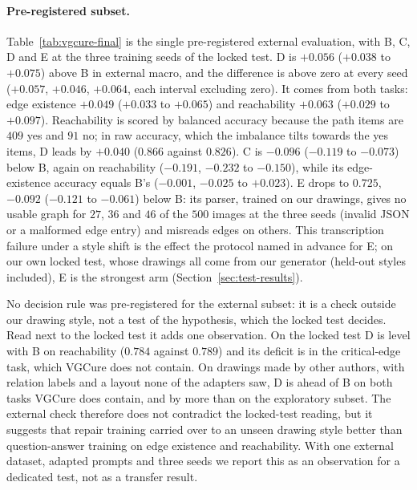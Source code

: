 \paragraph{Pre-registered subset.}
Table~\ref{tab:vgcure-final} is the single pre-registered external evaluation, with B, C, D
and E at the three training seeds of the locked test. D is $+0.056$ ($+0.038$ to $+0.075$)
above B in external macro, and the difference is above zero at every seed ($+0.057$, $+0.046$,
$+0.064$, each interval excluding zero). It comes from both tasks: edge existence $+0.049$
($+0.033$ to $+0.065$) and reachability $+0.063$ ($+0.029$ to $+0.097$). Reachability is scored by
balanced accuracy because the path items are $409$ yes and $91$ no; in raw accuracy, which the
imbalance tilts towards the yes items, D leads by $+0.040$ ($0.866$ against $0.826$). C is $-0.096$
($-0.119$ to $-0.073$) below B, again on reachability ($-0.191$, $-0.232$ to $-0.150$), while
its edge-existence accuracy equals B's ($-0.001$, $-0.025$ to $+0.023$). E drops to $0.725$,
$-0.092$ ($-0.121$ to $-0.061$) below B: its parser, trained on our drawings, gives no usable
graph for $27$, $36$ and $46$ of the $500$ images at the three seeds (invalid JSON or a
malformed edge entry) and misreads edges on others. This transcription failure under a style
shift is the effect the protocol named in advance for E; on our own locked test, whose
drawings all come from our generator (held-out styles included), E is the strongest arm
(Section~\ref{sec:test-results}).

No decision rule was pre-registered for the external subset: it is a check outside our drawing
style, not a test of the hypothesis, which the locked test decides. Read next to the locked
test it adds one observation. On the locked test D is level with B on reachability ($0.784$
against $0.789$) and its deficit is in the critical-edge task, which VGCure does not contain.
On drawings made by other authors, with relation labels and a layout none of the adapters saw,
D is ahead of B on both tasks VGCure does contain, and by more than on the exploratory subset.
The external check therefore does not contradict the locked-test reading, but it suggests that
repair training carried over to an unseen drawing style better than question-answer training
on edge existence and reachability. With one external dataset, adapted prompts and three seeds
we report this as an observation for a dedicated test, not as a transfer result.

\begin{table}[t]
\centering\small
\resizebox{\linewidth}{!}{}
\caption{Pre-registered VGCure subset ($500$ graphs, $1{,}500$ items), evaluated once after the
locked test; same protocol as Table~\ref{tab:vgcure-dev}.}
\label{tab:vgcure-final}
\end{table}
